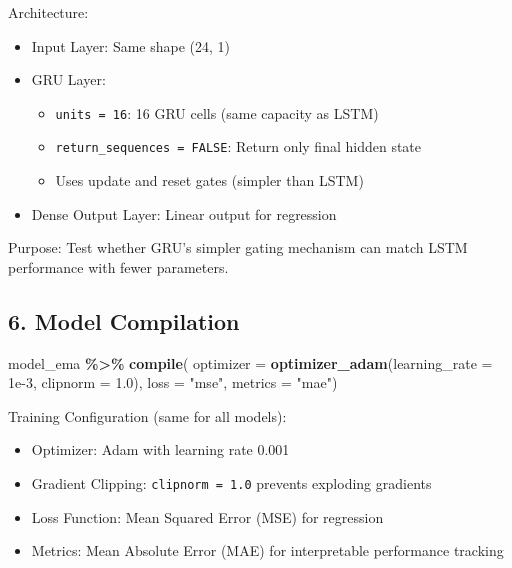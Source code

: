 \documentclass[
]{article}
\newenvironment{Shaded}{\begin{snugshade}}{\end{snugshade}}
\newcommand{\AttributeTok}[1]{\textcolor[rgb]{0.13,0.29,0.53}{#1}}
\newcommand{\FloatTok}[1]{\textcolor[rgb]{0.00,0.00,0.81}{#1}}
\newcommand{\FunctionTok}[1]{\textcolor[rgb]{0.13,0.29,0.53}{\textbf{#1}}}
\newcommand{\NormalTok}[1]{#1}
\newcommand{\SpecialCharTok}[1]{\textcolor[rgb]{0.81,0.36,0.00}{\textbf{#1}}}
\newcommand{\StringTok}[1]{\textcolor[rgb]{0.31,0.60,0.02}{#1}}
\providecommand{\tightlist}{%
  \setlength{\itemsep}{0pt}\setlength{\parskip}{0pt}}
\begin{document}
Architecture:

\begin{itemize}
\tightlist
\item
  Input Layer: Same shape (24, 1)
\item
  GRU Layer:

  \begin{itemize}
  \tightlist
  \item
    \texttt{units\ =\ 16}: 16 GRU cells (same capacity as LSTM)
  \item
    \texttt{return\_sequences\ =\ FALSE}: Return only final hidden state
  \item
    Uses update and reset gates (simpler than LSTM)
  \end{itemize}
\item
  Dense Output Layer: Linear output for regression
\end{itemize}

Purpose: Test whether GRU's simpler gating mechanism can match LSTM
performance with fewer parameters.

\subsection{6. Model Compilation}\label{model-compilation}

\begin{Shaded}
\begin{Highlighting}[]
\NormalTok{model\_ema }\SpecialCharTok{\%\textgreater{}\%} \FunctionTok{compile}\NormalTok{(}
  \AttributeTok{optimizer =} \FunctionTok{optimizer\_adam}\NormalTok{(}\AttributeTok{learning\_rate =} \FloatTok{1e{-}3}\NormalTok{, }\AttributeTok{clipnorm =} \FloatTok{1.0}\NormalTok{),}
  \AttributeTok{loss =} \StringTok{"mse"}\NormalTok{, }\AttributeTok{metrics =} \StringTok{"mae"}\NormalTok{)}
\end{Highlighting}
\end{Shaded}

Training Configuration (same for all models):

\begin{itemize}
\tightlist
\item
  Optimizer: Adam with learning rate 0.001
\item
  Gradient Clipping: \texttt{clipnorm\ =\ 1.0} prevents exploding
  gradients
\item
  Loss Function: Mean Squared Error (MSE) for regression
\item
  Metrics: Mean Absolute Error (MAE) for interpretable performance
  tracking
\end{itemize}
\end{document}
